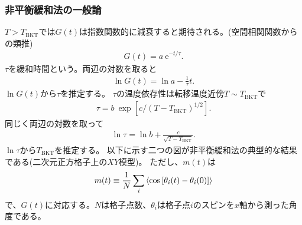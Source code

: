 \documentclass[12pt,titlepage,dvipdfmx]{jarticle}
\begin{document}
\subsubsection{非平衡緩和法の一般論}

$T>T_{\mathrm{BKT}}$では$G(t)$は指数関数的に減衰すると期待される。(空間相関関数からの類推)
\begin{align}
   G(t) =  a \ \mathrm e^{-t/\tau}.
\end{align}
$\tau$を緩和時間という。両辺の対数を取ると
\begin{align}
   \ln{G(t)} = \ln{a}-\frac{1}{\tau}t.
\end{align}
$\ln{G(t)}$から$\tau$を推定する。
$\tau$の温度依存性は転移温度近傍$T\sim T_{\mathrm{BKT}}$で
\begin{align}
   \tau = b \ \exp [c/(T-T_{\mathrm{BKT}})^{1/2}].
\end{align}
同じく両辺の対数を取って
\begin{align}
   \ln{\tau} = \ln{b} + \frac{c}{\sqrt{T-T_{\mathrm{BKT}}}}.
\end{align}
$\ln{\tau}$から$T_{\mathrm{BKT}}$を推定する\cite{Levenberg1944method,Marquardt1963algorithm}。
以下に示す二つの図が非平衡緩和法の典型的な結果である(二次元正方格子上の$XY$模型\cite{Ozeki2003})。
ただし、$m(t)$は
\begin{align}
   m(t) \equiv \frac{1}{N}\sum_i\ev{\cos{\qty[\theta_i(t) - \theta_i(0)]}}
\end{align}
で、$G(t)$に対応する。$N$は格子点数、$\theta_i$は格子点$i$のスピンを$x$軸から測った角度である。
%
\end{document}
